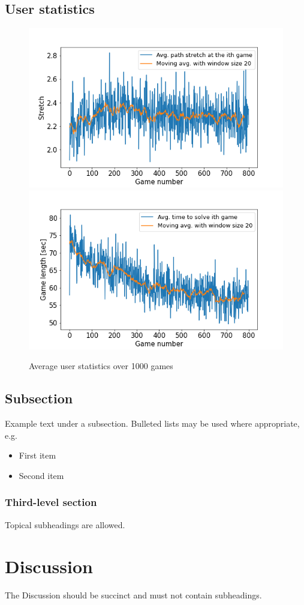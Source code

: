 \documentclass[fleqn,10pt]{wlscirep}
\begin{document}
\subsection*{User statistics}

\begin{figure}[H]
\centering
\includegraphics[width=0.45\linewidth]{figs/avg_stretch.png}
\includegraphics[width=0.45\linewidth]{figs/avg_game_length.png}
\caption{Average user statistics over 1000 games}
\label{fig:user_avg_stats}
\end{figure}

\subsection*{Subsection}

Example text under a subsection. Bulleted lists may be used where appropriate, e.g.

\begin{itemize}
\item First item
\item Second item
\end{itemize}

\subsubsection*{Third-level section}
 
Topical subheadings are allowed.

\section*{Discussion}

The Discussion should be succinct and must not contain subheadings.
\end{document}
